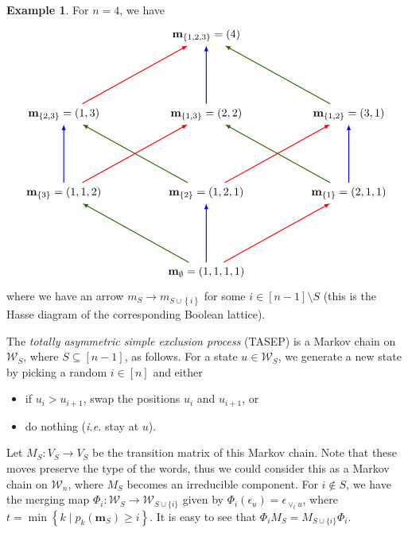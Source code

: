 \documentclass[reqno]{amsart}
\newcommand{\mbf}{\mathbf}
\newcommand{\0}{\phantom{c}}
\newcommand{\merge}[1]{\vee_{#1}} %
\newcommand{\mm}{\mathbf{m}}
\newcommand{\mcW}{\mathcal{W}}
\newcommand{\set}[1]{\left\{ #1 \right\}}
\newcommand{\defn}[1]{{\color{darkred}\emph{#1}}} %
\theoremstyle{plain}
\theoremstyle{definition}
\newtheorem{example}[thm]{Example}
\numberwithin{equation}{section}
\begin{document}
\begin{example}
  For $n = 4$, we have
  \[
  \begin{tikzpicture}[xscale=4.5,yscale=2.5,thick,>=latex]
  \node (E) at (1,0) {$\mbf{m}_{\emptyset} = (1,1,1,1)$};
  \node (1) at (2,1) {$\mbf{m}_{\{1\}} = (2,1,1)$};
  \node (2) at (1,1) {$\mbf{m}_{\{2\}} = (1,2,1)$};
  \node (3) at (0,1) {$\mbf{m}_{\{3\}} = (1,1,2)$};
  \node (12) at (2,2) {$\mbf{m}_{\{1,2\}} = (3,1)$};
  \node (13) at (1,2) {$\mbf{m}_{\{1,3\}} = (2,2)$};
  \node (23) at (0,2) {$\mbf{m}_{\{2,3\}} = (1,3)$};
  \node (123) at (1,3) {$\mbf{m}_{\{1,2,3\}} = (4)$};
  \draw[->,red] (E) -- (1);
  \draw[->,blue] (E) -- (2);
  \draw[->,dgreencolor] (E) -- (3);
  \draw[->,red] (2) -- (12);
  \draw[->,red] (3) -- (13);
  \draw[->,blue] (3) -- (23);
  \draw[->,blue] (1) -- (12);
  \draw[->,dgreencolor] (1) -- (13);
  \draw[->,dgreencolor] (2) -- (23);
  \draw[->,red] (23) -- (123);
  \draw[->,blue] (13) -- (123);
  \draw[->,dgreencolor] (12) -- (123);
  \end{tikzpicture}
  \]
  where we have an arrow $m_S \to m_{S \cup \set{i}}$ for some $i \in [n-1] \setminus S$ (this is the Hasse diagram of the corresponding Boolean lattice).
\end{example}

The \defn{totally asymmetric simple exclusion process} (TASEP) is a Markov chain on $\mcW_S$, where $S \subseteq[n-1]$, as follows.
For a state $u \in \mcW_S$, we generate a new state by picking a random $i \in [n]$ and either
\begin{itemize}
\item if $u_i > u_{i+1}$, swap the positions $u_i$ and $u_{i+1}$, or
\item do nothing (\textit{i.e.} stay at $u$).
\end{itemize}
Let $M_S \colon V_S \to V_S$ be the transition matrix of this Markov chain.
Note that these moves preserve the type of the words, thus we could consider this as a Markov chain on $\mcW_n$, where $M_S$ becomes an irreducible component.
For $i \notin S$, we have the merging map $\Phi_i \colon \mcW_S \to \mcW_{S\cup\{i\}}$ given by $\Phi_i(\epsilon_u) = \epsilon_{\merge{t}u}$, where $t = \min\set{k \mid p_k(\mm_S) \geq i}$.
It is easy to see that $\Phi_i M_S = M_{S\cup \{i\}} \Phi_i$. 
\end{document}
